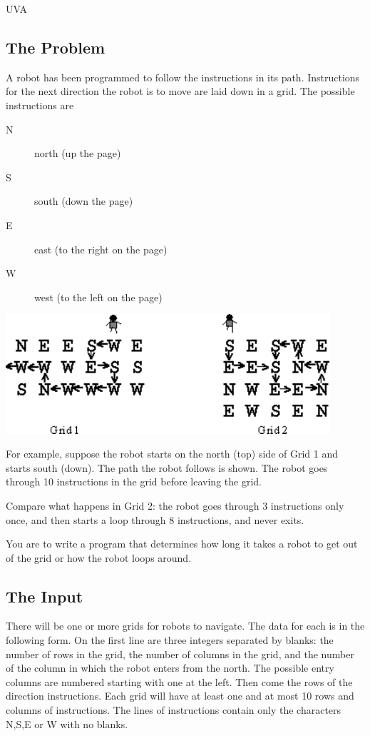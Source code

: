 

\noindent
UVA \bigskip

\subsection*{The Problem}

A robot has been programmed to follow the instructions in its path.
 Instructions for the next
direction the robot is to move are laid down in a grid.  The possible
instructions are

\begin{description}
    \item[N] north (up the page)
    \item[S] south (down the page)
    \item[E] east (to the right on the page)
    \item[W] west (to the left on the page)
\end{description}

\includegraphics[width=12cm]{problems/p10116.pdf}

For example, suppose the robot starts on the north (top) side of Grid 1
and starts
south (down).  The path the robot follows is shown.  The robot goes through 
10 instructions
in the grid before leaving the grid.

Compare what happens in Grid 2:  the robot goes through 3  instructions
only once, and then
starts a loop through 8 instructions, and never exits.

You are to write a program that determines how long it takes a robot to get out of the grid or
how the robot loops around.



\subsection*{The Input}

There will be one or more grids for robots to navigate.  The data for
each is in the following form. On the first line are three integers
separated by blanks:  the number of rows in the grid, the number of
columns in the grid, and the number of the column in which the robot
enters from the north.  The possible entry columns are numbered starting
with one at the left.  Then come the rows of the direction instructions.
Each grid will have at least one and at most 10 rows and columns
of instructions.  The lines of instructions contain only the characters
N,S,E or W
with no blanks.

